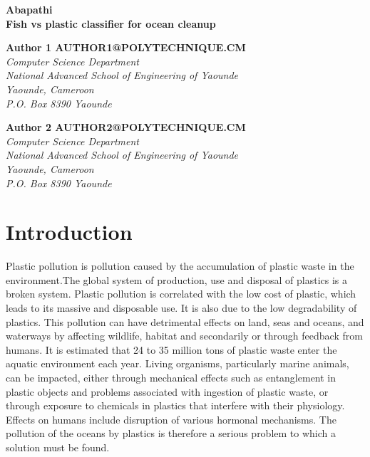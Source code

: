 \documentclass[a4paper, 12pt]{report}
\begin{document}
\hspace{50mm}
\hspace{50mm}


{\centering\Large\bfseries Abapathi\\ Fish vs plastic classifier for ocean cleanup \par}

\hspace{50mm}
\hspace{50mm}
\hspace{50mm}

\textbf{\flushleft\large Author 1 \hfill AUTHOR1@POLYTECHNIQUE.CM}
{\itshape \\ Computer Science Department\\ National Advanced School of Engineering of Yaounde\\
Yaounde, Cameroon\\
P.O. Box 8390 Yaounde}

\textbf{\flushleft\large Author 2 \hfill AUTHOR2@POLYTECHNIQUE.CM}
{\itshape \\ Computer Science Department\\ National Advanced School of Engineering of Yaounde\\
Yaounde, Cameroon\\
P.O. Box 8390 Yaounde}

\hspace{50mm}
\hspace{50mm}
\hspace{50mm}


\section{Introduction}

Plastic pollution is pollution caused by the accumulation of plastic waste in the environment.The global system of production, use and disposal of plastics is a broken system. Plastic pollution is correlated with the low cost of plastic, which leads to its massive and disposable use. It is also due to the low degradability of plastics. This pollution can have detrimental effects on land, seas and oceans, and waterways by affecting wildlife, habitat and secondarily or through feedback from humans. It is estimated that 24 to 35 million tons of plastic waste enter the aquatic environment each year. Living organisms, particularly marine animals, can be impacted, either through mechanical effects such as entanglement in plastic objects and problems associated with ingestion of plastic waste, or through exposure to chemicals in plastics that interfere with their physiology. Effects on humans include disruption of various hormonal mechanisms. The pollution of the oceans by plastics is therefore a serious problem to which a solution must be found.
\end{document}
